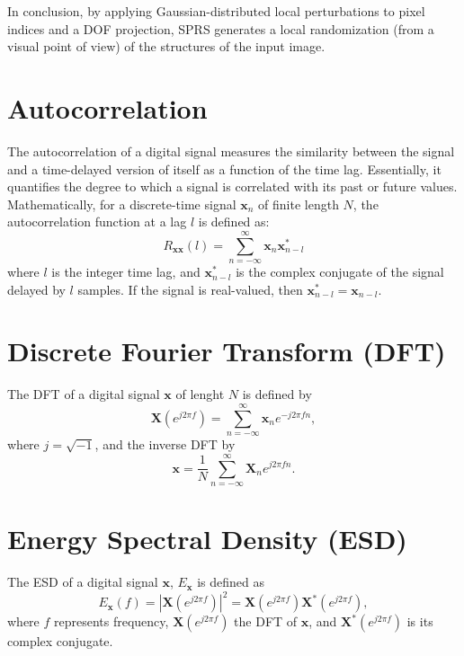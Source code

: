 \documentclass{article}
\begin{document}
In conclusion, by applying Gaussian-distributed local perturbations to
pixel indices and a DOF projection, SPRS generates a local
randomization (from a visual point of view) of the structures of the
input image.


\section{Autocorrelation}
\label{ape:autocorrelation}

The autocorrelation of a digital signal measures the similarity
between the signal and a time-delayed version of itself as a function
of the time lag. Essentially, it quantifies the degree to which a
signal is correlated with its past or future values. Mathematically,
for a discrete-time signal $\mathbf{x}_n$ of finite length $N$, the
autocorrelation function at a lag $l$ is defined as:
\begin{equation}
R_{\mathbf{xx}}(l)=\sum_{n=-\infty}^\infty{\mathbf{x}}_n \mathbf{x}^*_{n-l}
\end{equation}
where $l$ is the integer time lag, and $\mathbf{x}^* _{n-l}$ is the
complex conjugate of the signal delayed by $l$ samples. If the signal
is real-valued, then $\mathbf{x}^*_{n-l}=\mathbf{x}_{n-l}$.


\section{Discrete Fourier Transform (DFT)}

The DFT of a digital signal $\mathbf{x}$ of lenght $N$ is defined by
\begin{equation}
  \mathbf{X}(e^{j2\pi f})=\sum_{n=-\infty}^{\infty}\mathbf{x}_ne^{-j2\pi fn},
\end{equation}
where $j=\sqrt{-1}$, and the inverse DFT by
\begin{equation}
  \mathbf{x}=\frac{1}{N}\sum_{n=-\infty}^{\infty}\mathbf{X}_ne^{j2\pi fn}.
\end{equation}


\section{Energy Spectral Density (ESD)}

The ESD of a digital signal $\mathbf{x}$, $E_{\mathbf{x}}$ is defined
as
\begin{equation}
  E_{\mathbf{x}}(f)=|\mathbf{X}(e^{j2\pi f})|^2=\mathbf{X}(e^{j2\pi f})\mathbf{X}^*(e^{j2\pi f}),
\end{equation}
where $f$ represents frequency, $\mathbf{X}(e^{j2\pi f})$ the DFT of
$\mathbf{x}$, and $\mathbf{X}^*(e^{j2\pi f})$ is its complex
conjugate.
\end{document}
